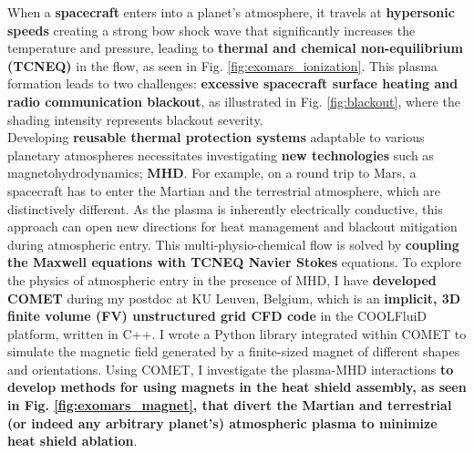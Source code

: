 \documentclass[11pt,sans]{wlscirep} %
\begin{document}
\noindent When a \textbf{spacecraft} enters into a planet's atmosphere, it travels at \textbf{hypersonic speeds} creating a strong bow shock wave that significantly increases the temperature and pressure, leading to \textbf{thermal and chemical non-equilibrium (TCNEQ)} in the flow, as seen in Fig. \ref{fig:exomars_ionization}. This plasma formation leads to two challenges: \textbf{excessive spacecraft surface heating and radio communication blackout}, as illustrated in Fig. \ref{fig:blackout}, where the shading intensity represents blackout severity\cite{sharma2024mhd,giangaspero20233d}. \\
Developing \textbf{reusable thermal protection systems} adaptable to various planetary atmospheres necessitates investigating \textbf{new technologies} such as magnetohydrodynamics; \textbf{MHD}. For example, on a round trip to Mars, a spacecraft has to enter the Martian and the terrestrial atmosphere, which are distinctively different. As the plasma is inherently electrically conductive, this approach can open new directions for heat management and blackout mitigation during atmospheric entry. This multi-physio-chemical flow is solved by \textbf{coupling the Maxwell equations with TCNEQ Navier Stokes} equations. To explore the physics of atmospheric entry in the presence of MHD, I have \textbf{developed COMET} during my postdoc at KU Leuven, Belgium, which is an \textbf{implicit, 3D finite volume (FV) unstructured grid CFD code} in the COOLFluiD platform, written in C++\cite{sharma2024mhd}. I wrote a Python library integrated within COMET to simulate the magnetic field generated by a finite-sized magnet of different shapes and orientations. Using COMET, I investigate the plasma-MHD interactions \textbf{to develop methods for using magnets in the heat shield assembly, as seen in Fig. \ref{fig:exomars_magnet}\cite{sharma2024mhd}, that divert the Martian and terrestrial (or indeed any arbitrary planet's) atmospheric plasma to minimize heat shield ablation}.
\par
\end{document}
